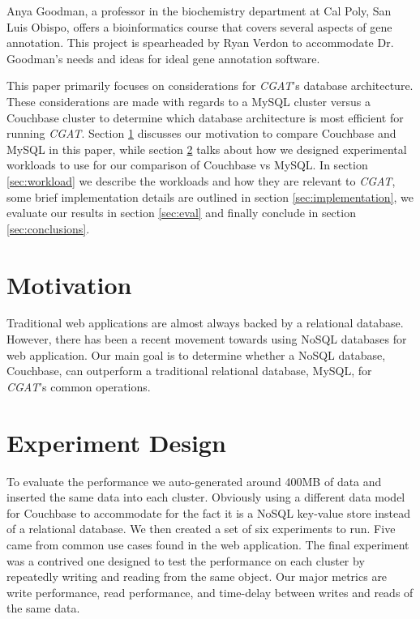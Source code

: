 \documentclass[]{IEEEtran}
\begin{document}
Anya Goodman, a professor in the biochemistry department at Cal Poly, San Luis
Obispo, offers a bioinformatics course that covers several aspects of gene
annotation. This project is spearheaded by Ryan Verdon to accommodate Dr.
Goodman's needs and ideas for ideal gene annotation software.

This paper primarily focuses on considerations for \textit{CGAT}'s database
architecture. These considerations are made with regards to a MySQL cluster
versus a Couchbase cluster to determine which database architecture is most
efficient for running \textit{CGAT}. Section \ref{sec:motive} discusses our
motivation to compare Couchbase and MySQL in this paper, while section
\ref{sec:design} talks about how we designed experimental workloads to use for
our comparison of Couchbase vs MySQL. In section \ref{sec:workload} we
describe the workloads and how they are relevant to \textit{CGAT}, some brief
implementation details are outlined in section \ref{sec:implementation}, we
evaluate our results in section \ref{sec:eval} and finally conclude in
section \ref{sec:conclusions}.

\section{Motivation}\label{sec:motive}
Traditional web applications are almost always backed by a relational database.
However, there has been a recent movement towards using NoSQL databases for
web application. Our main goal is to determine whether a NoSQL database, Couchbase,
can outperform a traditional relational database, MySQL, for \textit{CGAT}'s
common operations.

\section{Experiment Design}\label{sec:design}
To evaluate the performance we auto-generated around
400MB of data and inserted the same data into each cluster. Obviously using a
different data model for Couchbase to accommodate for the fact it is a NoSQL
key-value store instead of a relational database. We then created a set of six
experiments to run. Five came from common use cases found in the web
application. The final experiment was a contrived one designed to test the performance on each
cluster by repeatedly writing and reading from the same object. Our major
metrics are write performance, read performance, and time-delay between writes
and reads of the same data.
\end{document}

